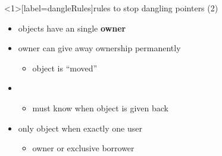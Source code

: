 \begin{frame}<1>[label=dangleRules]{rules to stop dangling pointers (2)}
    \begin{itemize}
    \item objects have an single \textbf{owner}
    \item owner can give away ownership permanently
        \begin{itemize}
        \item object is ``moved''
        \end{itemize}
    \item {}
        \begin{itemize}
        \item must know when object is given back
        \end{itemize}
    \item only  object when exactly one user
        \begin{itemize}
        \item owner or exclusive borrower
        \end{itemize}
    \end{itemize}
\end{frame}
